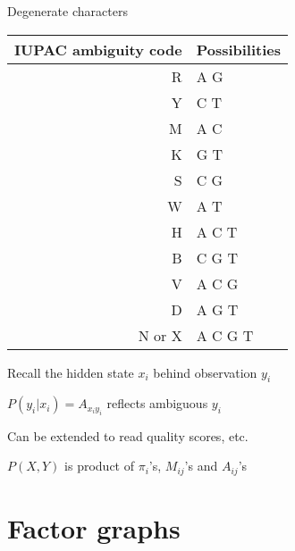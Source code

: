 \documentclass{beamer}
\begin{document}
\begin{frame}{Degenerate characters}

\small
\begin{tabular}{|r|l|}
\hline
IUPAC ambiguity code & Possibilities \\
\hline
R & A G \\
Y & C T \\
M & A C \\
K & G T \\
S & C G \\
W & A T \\
H & A C T \\
B & C G T \\
V & A C G \\
D & A G T \\
N or X & A C G T \\
\hline
\end{tabular}

\normalsize
\itemb
 \item Recall the hidden state $x_i$ behind observation $y_i$
 \item $P(y_i|x_i)=A_{x_i y_i}$ reflects ambiguous $y_i$
 \item Can be extended to read quality scores, etc.
 \item $P(X,Y)$ is product of $\pi_i$'s, $M_{ij}$'s and $A_{ij}$'s
\iteme

\end{frame}

\section{Factor graphs}


\newcommand\PXYFactorGraph{
\Tree [ .$f_1$ [ .$x_1$
 [ .$f_2$ [ .$x_2$ [ .$f_4$ [ .$x_4$ $f_{4a}$ ] ] [ .$f_5$ [ .$x_5$ $f_{5a}$ ] ] ] ]
 [ .$f_3$ [ .$x_3$ [ .$f_6$ [ .$x_6$ $f_{6a}$ ] ] [ .$f_7$ [ .$x_7$ $f_{7a}$ ] ] ] ]
] ]
}
\end{document}
